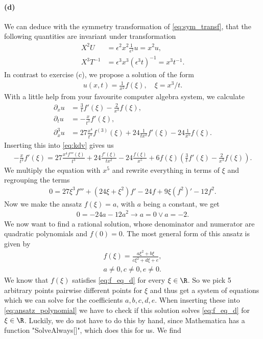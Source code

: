 \paragraph{(d)}
We  can deduce with the symmetry transformation of \cref{eq:sym_transf}, that the following quantities are invariant under transformation
\begin{align}
X^2U&=\epsilon^2x^2\frac{1}{\epsilon^2} u = x^2u,\\
X^3T^{-1}&=\epsilon^3x^3(\epsilon^3t)^{-1}=x^3t^{-1}.
\end{align}
In contrast to exercise (c), we propose a solution of the form
\begin{align}
u(x,t) = \frac{1}{x^2}f(\xi),\quad \xi=x^3/t.
\end{align}
With a little help from your favourite computer algebra system, we calculate
\begin{align}
\partial_x u&=\frac 3t f'\left(\xi\right)-\frac{2}{x^3}f\left(\xi\right),\\
\partial_t u&=-\frac{x}{t^2}f'\left(\xi\right),\\
\partial^3_x u&=27 \frac{x^4}{t^3} f^{(3)}\left(\xi\right)+24\frac{1}{tx^2}f'\left(\xi\right)-24\frac{1}{x^5}f\left(\xi\right).
\end{align}
Inserting this into \cref{eq:kdv} gives us 
\begin{align}
-\frac{x}{t^2} f'(\xi)= 27\frac{x^4f'''(\xi)}{t^3} + 24 \frac{f'(\xi)}{tx^2} - 24 \frac{f(\xi)}{x^5} +6f(\xi)(\frac 3t f'(\xi)-\frac{2}{x^3}f(\xi)).
\end{align}
We multiply the equation with $x^5$ and rewrite everything in terms of $\xi$ and regrouping the terms
\begin{align}
0= 27 \xi^3 f''' + (24\xi+\xi^2) f' - 24 f + 9\xi(f^2)' - 12f^2.\label{eq:f_eq_d}
\end{align} 
Now we make the ansatz $f(\xi)=a$, with $a$ being a constant, we get
\begin{align}
0=-24a-12a^2
\rightarrow a=0 \vee a= -2.
\end{align}
We now want to find a rational solution, whose denominator and numerator are quadratic polynomials and $f(0)=0$. The most general form of this ansatz is given by
\begin{align}
f(\xi)=\frac{a\xi^2+b\xi}{c\xi^2+d\xi+e},\label{eq:ansatz_polynomial}\\
a\neq 0, c\neq 0, e\neq0.
\end{align}
We know that $f(\xi)$ satisfies \cref{eq:f_eq_d} for every $\xi\in\R$. So we pick 5 arbitrary points pairwise different points for $\xi$ and thus get a system of equations which we can solve for the coefficients $a,b,c,d,e$. When inserting these into  \cref{eq:ansatz_polynomial} we have to check if this solution solves \cref{eq:f_eq_d} for $\xi\in\R$. Luckily, we do not have to do this by hand, since Mathematica has a function "SolveAlways[]", which does this for us. We find
